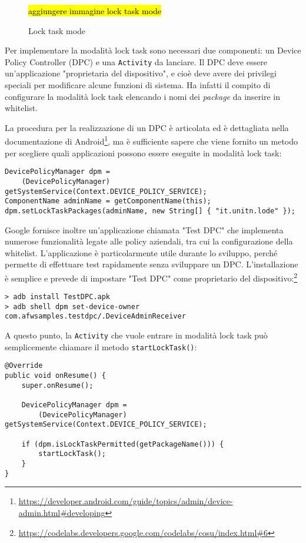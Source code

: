 \begin{figure}[h]
	\hl{aggiungere immagine lock task mode}
	\vspace{7cm}
	
	\caption{Lock task mode}
	\label{fig:kiosk_locktask}
\end{figure}

Per implementare la modalità lock task sono necessari due componenti: un Device Policy Controller (DPC) e una \texttt{Activity} da lanciare. Il DPC deve essere un'applicazione "proprietaria del dispositivo", e cioè deve avere dei privilegi speciali per modificare alcune funzioni di sistema. Ha infatti il compito di configurare la modalità lock task elencando i nomi dei \emph{package} da inserire in whitelist.

La procedura per la realizzazione di un DPC è articolata ed è dettagliata nella documentazione di Android\footnote{\url{https://developer.android.com/guide/topics/admin/device-admin.html\#developing}}, ma è sufficiente sapere che viene fornito un metodo per scegliere quali applicazioni possono essere eseguite in modalità lock task:

\begin{verbatim}
DevicePolicyManager dpm =
    (DevicePolicyManager) getSystemService(Context.DEVICE_POLICY_SERVICE);
ComponentName adminName = getComponentName(this);
dpm.setLockTaskPackages(adminName, new String[] { "it.unitn.lode" });
\end{verbatim}

Google fornisce inoltre un'applicazione chiamata "Test DPC" che implementa numerose funzionalità legate alle policy aziendali, tra cui la configurazione della whitelist. L'applicazione è particolarmente utile durante lo sviluppo, perché permette di effettuare test rapidamente senza sviluppare un DPC. L'installazione è semplice e prevede di impostare "Test DPC" come proprietario del dispositivo:\footnote{\url{https://codelabs.developers.google.com/codelabs/cosu/index.html\#6}}

\begin{verbatim}
> adb install TestDPC.apk
> adb shell dpm set-device-owner com.afwsamples.testdpc/.DeviceAdminReceiver
\end{verbatim}

A questo punto, la \texttt{Activity} che vuole entrare in modalità lock task può semplicemente chiamare il metodo \texttt{startLockTask()}:

\begin{verbatim}
@Override
public void onResume() {
    super.onResume();
    
    DevicePolicyManager dpm =
        (DevicePolicyManager) getSystemService(Context.DEVICE_POLICY_SERVICE);

    if (dpm.isLockTaskPermitted(getPackageName())) {
        startLockTask();
    }
}
\end{verbatim}

